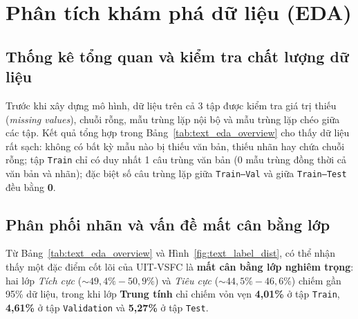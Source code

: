 \documentclass[12pt,a4paper]{article}
\begin{document}
\section{Phân tích khám phá dữ liệu (EDA)}

\subsection{Thống kê tổng quan và kiểm tra chất lượng dữ liệu}
Trước khi xây dựng mô hình, dữ liệu trên cả 3 tập được kiểm tra giá trị thiếu (\textit{missing values}), chuỗi rỗng, mẫu trùng lặp nội bộ và mẫu trùng lặp chéo giữa các tập. Kết quả tổng hợp trong Bảng~\ref{tab:text_eda_overview} cho thấy dữ liệu rất sạch: không có bất kỳ mẫu nào bị thiếu văn bản, thiếu nhãn hay chứa chuỗi rỗng; tập \texttt{Train} chỉ có duy nhất 1 câu trùng văn bản (0 mẫu trùng đồng thời cả văn bản và nhãn); đặc biệt số câu trùng lặp giữa \texttt{Train--Val} và giữa \texttt{Train--Test} đều bằng \textbf{0}.

\begin{table}[htbp]
\centering
\caption{Thống kê tổng quan và phân phối nhãn trên 3 tập dữ liệu UIT-VSFC}
\label{tab:text_eda_overview}
\scriptsize
\setlength{\tabcolsep}{4pt}
\end{table}

\subsection{Phân phối nhãn và vấn đề mất cân bằng lớp}
Từ Bảng~\ref{tab:text_eda_overview} và Hình~\ref{fig:text_label_dist}, có thể nhận thấy một đặc điểm cốt lõi của UIT-VSFC là \textbf{mất cân bằng lớp nghiêm trọng}: hai lớp \textit{Tích cực} ($\sim 49{,}4\% - 50{,}9\%$) và \textit{Tiêu cực} ($\sim 44{,}5\% - 46{,}6\%$) chiếm gần 95\% dữ liệu, trong khi lớp \textbf{Trung tính} chỉ chiếm vỏn vẹn \textbf{4,01\%} ở tập \texttt{Train}, \textbf{4,61\%} ở tập \texttt{Validation} và \textbf{5,27\%} ở tập \texttt{Test}.
\end{document}
